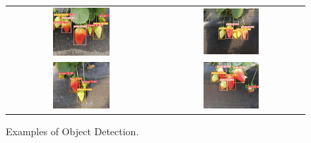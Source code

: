 \begin{figure}[H]
  \centering
  \begin{tabular}{cc}
      \includegraphics[width=0.4\textwidth]{photos/chapter05/25.jpg} & \includegraphics[width=0.4\textwidth]{photos/chapter05/26.jpg} \\[2pt]
      \includegraphics[width=0.4\textwidth]{photos/chapter05/28.jpg} & \includegraphics[width=0.4\textwidth]{photos/chapter05/27.jpg} \\[2pt]
  \end{tabular}
  \caption{Examples of Object Detection.}
\end{figure}
